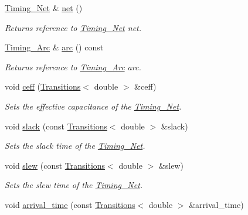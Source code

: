 \begin{DoxyCompactItemize}
\hyperlink{classTiming__Analysis_1_1Timing__Net}{Timing\-\_\-\-Net} \& \hyperlink{classTiming__Analysis_1_1Timing__Point_ae5be69561ff151feb055e8081911d4c1}{net} ()
\begin{DoxyCompactList}\small\item\em Returns reference to \hyperlink{classTiming__Analysis_1_1Timing__Net}{Timing\-\_\-\-Net} net. \end{DoxyCompactList}\item 
\hyperlink{classTiming__Analysis_1_1Timing__Arc}{Timing\-\_\-\-Arc} \& \hyperlink{classTiming__Analysis_1_1Timing__Point_adfac3529231393d429f746d9e1f1bfb6}{arc} () const 
\begin{DoxyCompactList}\small\item\em Returns reference to \hyperlink{classTiming__Analysis_1_1Timing__Arc}{Timing\-\_\-\-Arc} arc. \end{DoxyCompactList}\item 
void \hyperlink{classTiming__Analysis_1_1Timing__Point_ab4f9a99d6dad95ec709f165f57478e66}{ceff} (\hyperlink{classTransitions}{Transitions}$<$ double $>$ \&ceff)
\begin{DoxyCompactList}\small\item\em Sets the effective capacitance of the \hyperlink{classTiming__Analysis_1_1Timing__Net}{Timing\-\_\-\-Net}. \end{DoxyCompactList}\item 
void \hyperlink{classTiming__Analysis_1_1Timing__Point_a18a4b15b4612ea98ebba0f1f1e25db18}{slack} (const \hyperlink{classTransitions}{Transitions}$<$ double $>$ \&slack)
\begin{DoxyCompactList}\small\item\em Sets the slack time of the \hyperlink{classTiming__Analysis_1_1Timing__Net}{Timing\-\_\-\-Net}. \end{DoxyCompactList}\item 
void \hyperlink{classTiming__Analysis_1_1Timing__Point_ac8040357b9d6e8bc62d2958b4ffb4da4}{slew} (const \hyperlink{classTransitions}{Transitions}$<$ double $>$ \&slew)
\begin{DoxyCompactList}\small\item\em Sets the slew time of the \hyperlink{classTiming__Analysis_1_1Timing__Net}{Timing\-\_\-\-Net}. \end{DoxyCompactList}\item 
void \hyperlink{classTiming__Analysis_1_1Timing__Point_a28f687613d6d4d9ec544f6b90c8d16e6}{arrival\-\_\-time} (const \hyperlink{classTransitions}{Transitions}$<$ double $>$ \&arrival\-\_\-time)

\end{DoxyCompactItemize}
